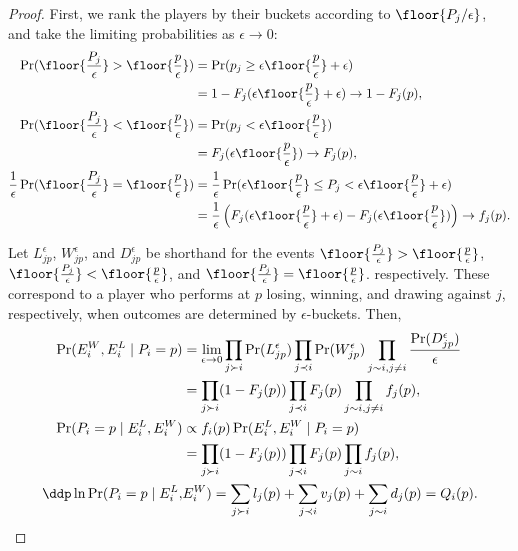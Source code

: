 \begin{proof}
First, we rank the players by their buckets according to $\floor{P_j/\epsilon}$, and take the limiting probabilities as $\epsilon\rightarrow 0$:
\begin{align*}
    \Pr(\floor{\frac{P_j}\epsilon} > \floor{\frac{p}\epsilon})
    &= \Pr(p_j \ge \epsilon\floor{\frac{p}\epsilon} + \epsilon)
    \\&= 1 - F_j(\epsilon\floor{\frac{p}\epsilon} + \epsilon)
    \rightarrow 1 - F_j(p),
    \\\Pr(\floor{\frac{P_j}\epsilon} < \floor{\frac{p}\epsilon})
    &= \Pr(p_j < \epsilon\floor{\frac{p}\epsilon})
    \\&= F_j(\epsilon\floor{\frac{p}\epsilon})
    \rightarrow F_j(p),
    \\\frac 1\epsilon \Pr(\floor{\frac{P_j}\epsilon} = \floor{\frac{p}\epsilon})
    &= \frac 1\epsilon \Pr(\epsilon\floor{\frac{p}\epsilon} \le P_j < \epsilon\floor{\frac{p}\epsilon} + \epsilon)
    \\&= \frac 1\epsilon\left( F_j(\epsilon\floor{\frac{p}\epsilon} + \epsilon) - F_j(\epsilon\floor{\frac{p}\epsilon}) \right)
    \rightarrow f_j(p).
\end{align*}

Let $L_{jp}^\epsilon$, $W_{jp}^\epsilon$, and $D_{jp}^\epsilon$ be shorthand for the events $\floor{\frac{P_j}\epsilon} > \floor{\frac{p}\epsilon}$, $\floor{\frac{P_j}\epsilon} < \floor{\frac{p}\epsilon}$, and $\floor{\frac{P_j}\epsilon} = \floor{\frac{p}\epsilon}$. respectively. These correspond to a player who performs at $p$ losing, winning, and drawing against $j$, respectively, when outcomes are determined by $\epsilon$-buckets. Then,
\begin{align*}
\Pr(E^W_i,E^L_i\mid P_i=p)
&= \lim_{\epsilon\rightarrow 0}
\prod_{j \succ i} \Pr(L_{jp}^\epsilon)
\prod_{j \prec i} \Pr(W_{jp}^\epsilon)
\prod_{j \sim i, j\ne i} \frac{\Pr(D_{jp}^\epsilon)}\epsilon
\\&= \prod_{j \succ i} (1 - F_j(p)) \prod_{j \prec i} F_j(p) \prod_{j \sim i, j\ne i} f_j(p),
\\\Pr(P_i=p \mid E^L_i,E^W_i)
&\propto f_i(p) \Pr(E^L_i,E^W_i\mid P_i=p)
\\&= \prod_{j \succ i} (1 - F_j(p)) \prod_{j \prec i} F_j(p) \prod_{j \sim i} f_j(p),
\\\ddp\ln \Pr(P_i=p \mid E^L_i,& E^W_i) = \sum_{j \succ i} l_j(p) + \sum_{j \prec i} v_j(p) + \sum_{j \sim i} d_j(p) = Q_i(p).
\end{align*}


\end{proof}
